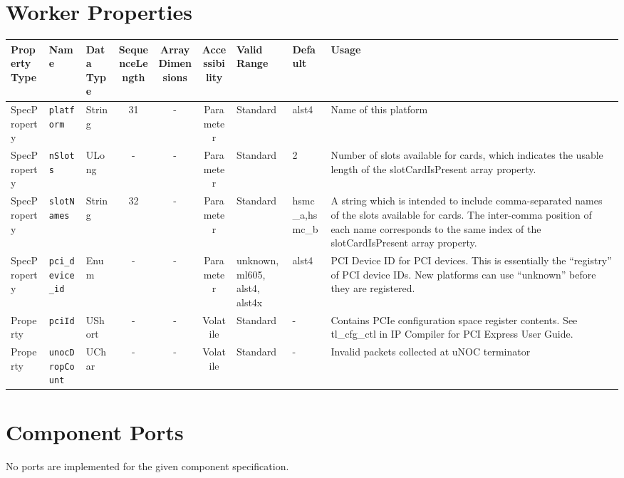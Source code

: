 \documentclass{article}
\begin{document}
\begin{landscape}
	\section*{Worker Properties}
	\begin{scriptsize}
		\begin{tabular}{|p{1.5cm}|p{2.5cm}|p{1.5cm}|c|c|c|p{2cm}|p{2cm}|p{3cm}|}
			\hline
			\rowcolor{blue}
			Property Type & Name                  & Data Type  & SequenceLength & ArrayDimensions & Accessibility       & Valid Range & Default & Usage                        \\
			\hline
			SpecProperty & \verb+platform+       & String & 31            & -               & Parameter & Standard & alst4 & Name of this platform               \\
			\hline
			SpecProperty & \verb+nSlots+         & ULong  & -             & -               & Parameter & Standard & 2 & Number of slots available for cards, which indicates the usable length of the slotCardIsPresent array property. \\
			\hline
			SpecProperty & \verb+slotNames+      & String & 32            & -               & Parameter & Standard & hsmc\_a,hsmc\_b   & A string which is intended to include comma-separated names of the slots available for cards. The inter-comma position of each name corresponds to the same index of the slotCardIsPresent array property. \\
			\hline
			SpecProperty & \verb+pci_device_id+ & Enum & -              & -               & Parameter & unknown, ml605, alst4, alst4x & alst4 & PCI Device ID for PCI devices. This is essentially the ``registry'' of PCI device IDs. New platforms can use ``unknown'' before they are registered. \\
			\hline
			Property & \verb+pciId+              & UShort & -             & -               & Volatile            & Standard    & -       & Contains PCIe configuration space register contents. See tl\_cfg\_ctl in IP Compiler for PCI Express User Guide. \\
			\hline
			Property & \verb+unocDropCount+      & UChar & -              & -               & Volatile            & Standard    & -       & Invalid packets collected at uNOC terminator \\
			\hline
		\end{tabular}
	\end{scriptsize}

	\section*{Component Ports}
	No ports are implemented for the given component specification.


\end{landscape}
\end{document}
